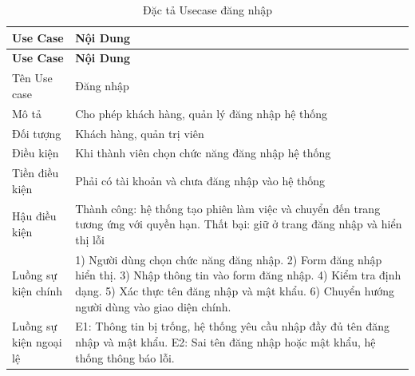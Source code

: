 \documentclass[../BTL.tex]{subfiles}
\begin{document}
\begin{longtable}{|p{}|p{}|}
\caption{Đặc tả Usecase đăng nhập}\label{tab:usecase-dang-nhap}\\
\hline
\textbf{Use Case} & \textbf{Nội Dung} \\
\hline
\endfirsthead
\hline
\textbf{Use Case} & \textbf{Nội Dung} \\
\hline
\endhead
Tên Use case & Đăng nhập \\
\hline
Mô tả & Cho phép khách hàng, quản lý đăng nhập hệ thống \\
\hline
Đối tượng & Khách hàng, quản trị viên \\
\hline
Điều kiện & Khi thành viên chọn chức năng đăng nhập hệ thống \\
\hline
Tiền điều kiện & Phải có tài khoản và chưa đăng nhập vào hệ thống \\
\hline
Hậu điều kiện & Thành công: hệ thống tạo phiên làm việc và chuyển đến trang tương ứng với quyền hạn. Thất bại: giữ ở trang đăng nhập và hiển thị lỗi \\
\hline
Luồng sự kiện chính & 1) Người dùng chọn chức năng đăng nhập. 2) Form đăng nhập hiển thị. 3) Nhập thông tin vào form đăng nhập. 4) Kiểm tra định dạng. 5) Xác thực tên đăng nhập và mật khẩu. 6) Chuyển hướng người dùng vào giao diện chính. \\
\hline
Luồng sự kiện ngoại lệ & E1: Thông tin bị trống, hệ thống yêu cầu nhập đầy đủ tên đăng nhập và mật khẩu. E2: Sai tên đăng nhập hoặc mật khẩu, hệ thống thông báo lỗi. \\
\hline
\end{longtable}
\end{document}
